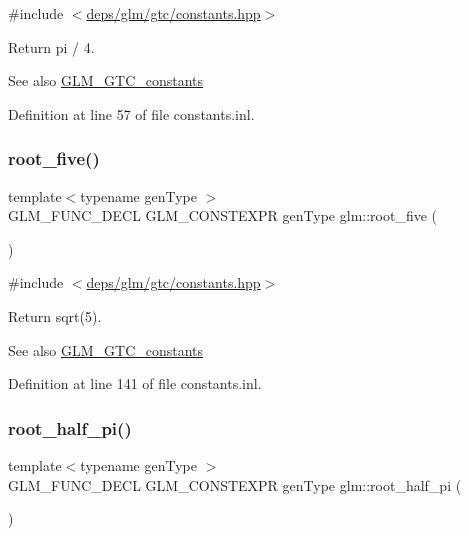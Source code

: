 {\ttfamily \#include $<$\hyperlink{constants_8hpp}{deps/glm/gtc/constants.\+hpp}$>$}

Return pi / 4. \begin{DoxySeeAlso}{See also}
\hyperlink{group__gtc__constants}{G\+L\+M\+\_\+\+G\+T\+C\+\_\+constants} 
\end{DoxySeeAlso}


Definition at line 57 of file constants.\+inl.

\mbox{\label{group__gtc__constants_gae9ebbded75b53d4faeb1e4ef8b3347a2}} 
\subsubsection{\texorpdfstring{root\+\_\+five()}{root\_five()}}
{\footnotesize\ttfamily template$<$typename gen\+Type $>$ \\
G\+L\+M\+\_\+\+F\+U\+N\+C\+\_\+\+D\+E\+CL G\+L\+M\+\_\+\+C\+O\+N\+S\+T\+E\+X\+PR gen\+Type glm\+::root\+\_\+five (\begin{DoxyParamCaption}{ }\end{DoxyParamCaption})}



{\ttfamily \#include $<$\hyperlink{constants_8hpp}{deps/glm/gtc/constants.\+hpp}$>$}

Return sqrt(5). \begin{DoxySeeAlso}{See also}
\hyperlink{group__gtc__constants}{G\+L\+M\+\_\+\+G\+T\+C\+\_\+constants} 
\end{DoxySeeAlso}


Definition at line 141 of file constants.\+inl.

\mbox{\label{group__gtc__constants_ga4e276cb823cc5e612d4f89ed99c75039}} 
\subsubsection{\texorpdfstring{root\+\_\+half\+\_\+pi()}{root\_half\_pi()}}
{\footnotesize\ttfamily template$<$typename gen\+Type $>$ \\
G\+L\+M\+\_\+\+F\+U\+N\+C\+\_\+\+D\+E\+CL G\+L\+M\+\_\+\+C\+O\+N\+S\+T\+E\+X\+PR gen\+Type glm\+::root\+\_\+half\+\_\+pi (\begin{DoxyParamCaption}{ }\end{DoxyParamCaption})}



